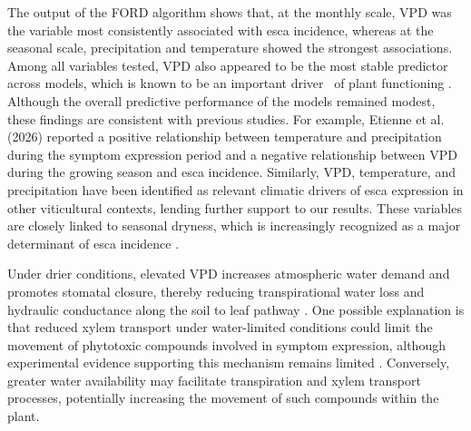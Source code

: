The output of the FORD algorithm shows that, at the monthly scale, VPD was the variable most consistently associated with esca incidence, whereas at the seasonal scale, precipitation and temperature showed the strongest associations. Among all variables tested, VPD also appeared to be the most stable predictor across models, which is known to be an important driver ~of plant functioning \citep{grossiord_plant_2020}. Although the overall predictive performance of the models remained modest, these findings are consistent with previous studies. For example, Etienne et al. (2026) reported a positive relationship between temperature and precipitation during the symptom expression period and a negative relationship between VPD during the growing season and esca incidence. Similarly, VPD, temperature, and precipitation have been identified as relevant climatic drivers of esca expression in other viticultural contexts, lending further support to our results. These variables are closely linked to seasonal dryness, which is increasingly recognized as a major determinant of esca incidence \citep{bortolami_grapevines_2021}.

Under drier conditions, elevated VPD increases atmospheric water demand and promotes stomatal closure, thereby reducing transpirational water loss \citep{grossiord_plant_2020} and hydraulic conductance along the soil to leaf pathway \citep{zufferey_stomatal_2012}. One possible explanation is that reduced xylem transport under water-limited conditions could limit the movement of phytotoxic compounds involved in symptom expression, although experimental evidence supporting this mechanism remains limited \citep{bortolami_grapevines_2021}. Conversely, greater water availability may facilitate transpiration and xylem transport processes, potentially increasing the movement of such compounds within the plant.

